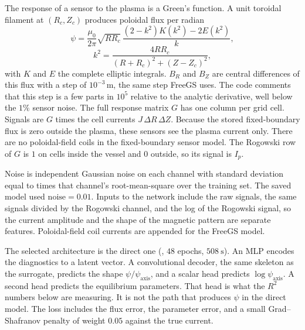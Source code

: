 \documentclass[11pt,a4paper,oneside,openany]{book}
\newcommand{\code}{\path}
\numberwithin{equation}{chapter}
\newcommand{\Ip}{I_{p}}
\theoremstyle{definition}
\begin{document}
The response of a sensor to the plasma is a Green's function. A unit toroidal filament at \((R_{c},Z_{c})\) produces poloidal flux per radian
\begin{equation}
\label{eq:green}
\psi=\frac{\mu_{0}}{2\pi}\sqrt{R R_{c}}\,
\frac{(2-k^{2})K(k^{2})-2E(k^{2})}{k},
\end{equation}
\begin{equation}
\label{eq:k2}
k^{2}=\frac{4 R R_{c}}{(R+R_{c})^{2}+(Z-Z_{c})^{2}},
\end{equation}
with \(K\) and \(E\) the complete elliptic integrals. \(B_{R}\) and \(B_{Z}\) are central differences of this flux with a step of \(10^{-3}\,\mathrm{m}\), the same step FreeGS uses. The code comments that this step is a few parts in \(10^{5}\) relative to the analytic derivative, well below the \(1\%\) sensor noise. The full response matrix \(G\) has one column per grid cell. Signals are \(G\) times the cell currents \(J\,\Delta R\,\Delta Z\). Because the stored fixed-boundary flux is zero outside the plasma, these sensors see the plasma current only. There are no poloidal-field coils in the fixed-boundary sensor model. The Rogowski row of \(G\) is \(1\) on cells inside the vessel and \(0\) outside, so its signal is \(\Ip\).

Noise is independent Gaussian noise on each channel with standard deviation equal to \code{noise} times that channel's root-mean-square over the training set. The saved model used \(\mathrm{noise}=0.01\). Inputs to the network include the raw signals, the same signals divided by the Rogowski channel, and the log of the Rogowski signal, so the current amplitude and the shape of the magnetic pattern are separate features. Poloidal-field coil currents are appended for the FreeGS model.

The selected architecture is the direct one (\code{outputs/inverse/metrics.json}, \(48\) epochs, \(\qty{508}{\second}\)). An MLP encodes the diagnostics to a latent vector. A convolutional decoder, the same skeleton as the surrogate, predicts the shape \(\psi/\psi_{\mathrm{axis}}\), and a scalar head predicts \(\log\psi_{\mathrm{axis}}\). A second head predicts the equilibrium parameters. That head is what the \(R^{2}\) numbers below are measuring. It is not the path that produces \(\psi\) in the direct model. The loss includes the flux error, the parameter error, and a small Grad--Shafranov penalty of weight \(0.05\) against the true current.
\end{document}
